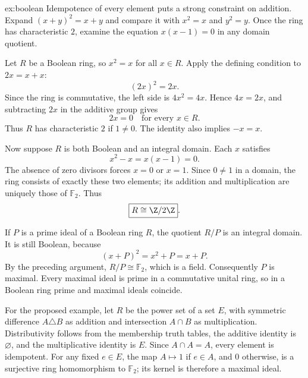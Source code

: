 \begin{solution}{ex:boolean}
\idea Idempotence of every element puts a strong constraint on addition. Expand $(x+y)^2=x+y$ and compare it with $x^2=x$ and $y^2=y$. Once the ring has characteristic $2$, examine the equation $x(x-1)=0$ in any domain quotient.

\writeup Let $R$ be a Boolean ring, so $x^2=x$ for all $x\in R$. Apply the defining condition to $2x=x+x$:
\[
(2x)^2=2x.
\]
Since the ring is commutative, the left side is $4x^2=4x$. Hence $4x=2x$, and subtracting $2x$ in the additive group gives
\[
\boxed{2x=0\quad\text{for every }x\in R}.
\]
Thus $R$ has characteristic $2$ if $1\ne0$. The identity also implies $-x=x$.

Now suppose $R$ is both Boolean and an integral domain. Each $x$ satisfies
\[
x^2-x=x(x-1)=0.
\]
The absence of zero divisors forces $x=0$ or $x=1$. Since $0\ne1$ in a domain, the ring consists of exactly these two elements; its addition and multiplication are uniquely those of $\mathbb F_2$. Thus
\[
\boxed{R\cong\Z/2\Z}.
\]

If $P$ is a prime ideal of a Boolean ring $R$, the quotient $R/P$ is an integral domain. It is still Boolean, because
\[
(x+P)^2=x^2+P=x+P.
\]
By the preceding argument, $R/P\cong\mathbb F_2$, which is a field. Consequently $P$ is maximal. Every maximal ideal is prime in a commutative unital ring, so in a Boolean ring prime and maximal ideals coincide.

For the proposed example, let $R$ be the power set of a set $E$, with symmetric difference $A\triangle B$ as addition and intersection $A\cap B$ as multiplication. Distributivity follows from the membership truth tables, the additive identity is $\varnothing$, and the multiplicative identity is $E$. Since $A\cap A=A$, every element is idempotent. For any fixed $e\in E$, the map $A\mapsto 1$ if $e\in A$, and $0$ otherwise, is a surjective ring homomorphism to $\mathbb F_2$; its kernel is therefore a maximal ideal.
\end{solution}

